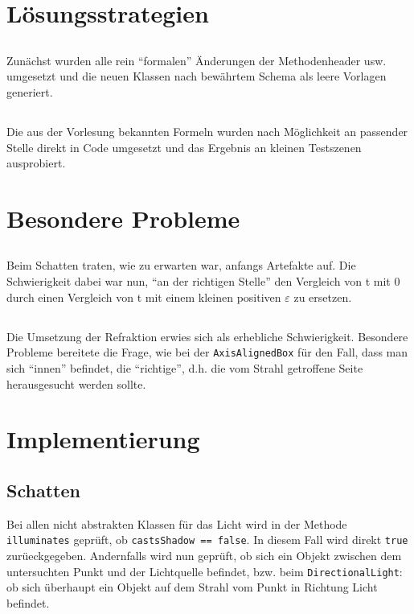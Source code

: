 \documentclass[11pt]{amsart}
\begin{document}
\section{L\"osungsstrategien}
\subsection{}
Zun\"achst wurden alle rein "`formalen"' \"Anderungen der Methodenheader usw. umgesetzt und die neuen Klassen nach 
bew\"ahrtem Schema als leere Vorlagen generiert.

\subsection{}
Die aus der Vorlesung bekannten Formeln wurden nach M\"oglichkeit an passender Stelle direkt in Code umgesetzt und das 
Ergebnis an kleinen Testszenen ausprobiert.



\section{Besondere Probleme}
\subsection{}
Beim Schatten traten, wie zu erwarten war, anfangs Artefakte auf. Die Schwierigkeit dabei war nun, "`an der richtigen 
Stelle"' den Vergleich von t mit 0 durch einen Vergleich von t mit einem kleinen positiven $\varepsilon$ zu ersetzen.

\subsection{}
Die Umsetzung der Refraktion erwies sich als erhebliche Schwierigkeit. Besondere Probleme bereitete die Frage, wie bei 
der \texttt{AxisAlignedBox} f\"ur den Fall, dass man sich "`innen"' befindet, die "`richtige"', d.h. die vom Strahl 
getroffene Seite herausgesucht werden sollte.



\section{Implementierung}
\subsection{Schatten}
Bei allen nicht abstrakten Klassen f\"ur das Licht wird in der Methode \texttt{illuminates} gepr\"uft, ob 
\texttt{castsShadow == false}. In diesem Fall wird direkt \texttt{true} zur\"ueckgegeben. Andernfalls wird nun 
gepr\"uft, ob sich ein Objekt zwischen dem untersuchten Punkt und der Lichtquelle befindet, bzw. beim 
\texttt{DirectionalLight}: ob sich \"uberhaupt ein Objekt auf dem Strahl vom Punkt in Richtung Licht befindet.
\end{document}

